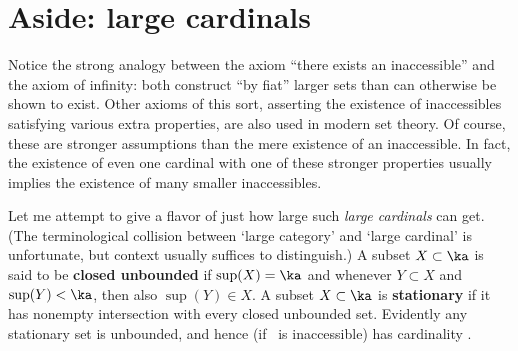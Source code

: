 \documentclass{amsart}
\begin{document}
\section{Aside: large cardinals}
\label{sec:large-cardinals}

Notice the strong analogy between the axiom ``there exists an
inaccessible'' and the axiom of infinity: both construct ``by fiat''
larger sets than can otherwise be shown to exist.  Other axioms of
this sort, asserting the existence of inaccessibles satisfying various
extra properties, are also used in modern set theory.  Of course,
these are stronger assumptions than the mere existence of an
inaccessible.  In fact, the existence of even one cardinal with one of
these stronger properties usually implies the existence of many
smaller inaccessibles.

Let me attempt to give a flavor of just how large such \emph{large
  cardinals} can get.  (The terminological collision between `large
category' and `large cardinal' is unfortunate, but context usually
suffices to distinguish.)  A subset $X\subset\ka$ is said to be
\textbf{closed unbounded} if $\sup(X) = \ka$ and whenever $Y\subset X$
and $\sup(Y) <\ka$, then also $\sup(Y) \in X$.  A subset $X\subset
\ka$ is \textbf{stationary} if it has nonempty intersection with every
closed unbounded set.  Evidently any stationary set is unbounded, and
hence (if \ka\ is inaccessible) has cardinality \ka.
\end{document}
